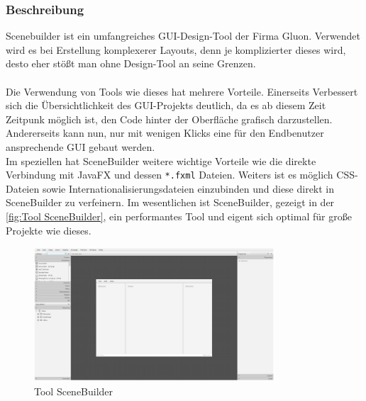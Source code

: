 \subsubsection{Beschreibung}
Scenebuilder ist ein umfangreiches GUI-Design-Tool der Firma Gluon.
Verwendet wird es bei Erstellung komplexerer Layouts, denn je komplizierter dieses wird, desto eher stößt man ohne Design-Tool an seine Grenzen.\\\\
Die Verwendung von Tools wie dieses hat mehrere Vorteile.
Einerseits Verbessert sich die Übersichtlichkeit des GUI-Projekts deutlich, da es ab diesem Zeit Zeitpunk möglich ist, den Code hinter der Oberfläche grafisch darzustellen.
Andererseits kann nun, nur mit wenigen Klicks eine für den Endbenutzer ansprechende GUI gebaut werden.\\
Im speziellen hat SceneBuilder weitere wichtige Vorteile wie die direkte Verbindung mit JavaFX und dessen \lstinline{*.fxml} Dateien.
Weiters ist es möglich CSS-Dateien sowie Internationalisierungsdateien einzubinden und diese direkt in SceneBuilder zu verfeinern.
Im wesentlichen ist SceneBuilder, gezeigt in der \autoref{fig:Tool SceneBuilder}, ein performantes Tool und eigent sich optimal für große Projekte wie dieses.
\begin{figure}[H]
    \centering
    \includegraphics[width=0.8\textwidth]{fig/ainf/SceneBuilder.png}
    \caption{Tool SceneBuilder}
    \label{fig:Tool SceneBuilder}
\end{figure}
